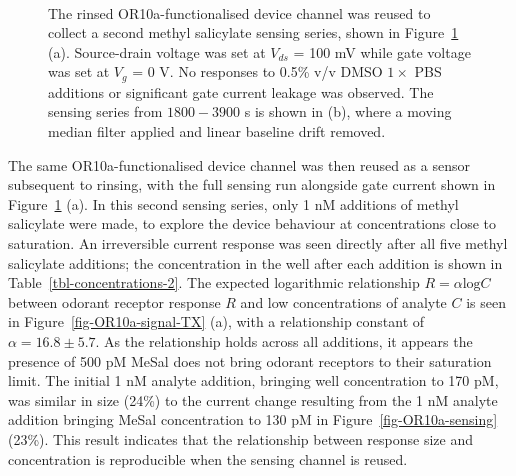 \documentclass[
  a4paper,
]{scrbook}
\begin{document}
\begin{figure}
\begin{minipage}[t]{0.70\linewidth}
{{}

}

\end{minipage}%
%
\begin{minipage}[t]{0.15\linewidth}

{\centering 

~

}

\end{minipage}%

\caption[A second methyl salicylate sensing series performed using the
rinsed OR10a-functionalised device channel, alongside the same series
filtered and with baseline drift
removed.]{\label{fig-OR10a-responses}The rinsed OR10a-functionalised
device channel was reused to collect a second methyl salicylate sensing
series, shown in Figure~\ref{fig-OR10a-responses} (a). Source-drain
voltage was set at \(V_{ds}\) = 100 mV while gate voltage was set at
\(V_g\) = 0 V. No responses to 0.5\% v/v DMSO \(1 \times\) PBS additions
or significant gate current leakage was observed. The sensing series
from \(1800-3900\) s is shown in (b), where a moving median filter
applied and linear baseline drift removed.}

\end{figure}

The same OR10a-functionalised device channel was then reused as a sensor
subsequent to rinsing, with the full sensing run alongside gate current
shown in Figure~\ref{fig-OR10a-responses} (a). In this second sensing
series, only 1 nM additions of methyl salicylate were made, to explore
the device behaviour at concentrations close to saturation. An
irreversible current response was seen directly after all five methyl
salicylate additions; the concentration in the well after each addition
is shown in Table~\ref{tbl-concentrations-2}. The expected logarithmic
relationship \(R = \alpha\textrm{log}C\) between odorant receptor
response \(R\) and low concentrations of analyte \(C\) is seen in
Figure~\ref{fig-OR10a-signal-TX} (a), with a relationship constant of
\(\alpha =16.8\pm5.7\). As the relationship holds across all additions,
it appears the presence of 500 pM MeSal does not bring odorant receptors
to their saturation limit. The initial 1 nM analyte addition, bringing
well concentration to 170 pM, was similar in size (24\%) to the current
change resulting from the 1 nM analyte addition bringing MeSal
concentration to 130 pM in Figure~\ref{fig-OR10a-sensing} (23\%). This
result indicates that the relationship between response size and
concentration is reproducible when the sensing channel is reused.
\end{document}
